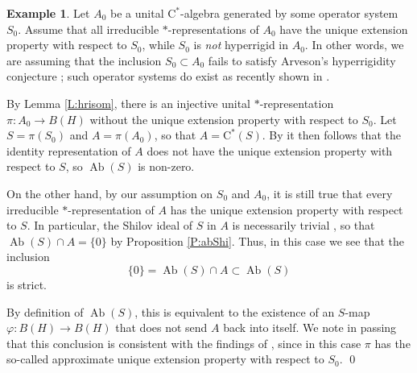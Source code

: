 \documentclass[10pt]{amsart}
\newcommand{\rC}{\mathrm{C}}
\renewcommand{\phi}{\varphi}
\newcommand{\Ab}{\operatorname{Ab}}
\theoremstyle{definition}
\newtheorem{example}{Example}
\begin{document}
\begin{example}\label{E:BDO}
Let $A_0$ be a unital $\rC^*$-algebra generated by some operator system $S_0$. Assume that all irreducible $*$-representations of $A_0$ have the unique extension property with respect to $S_0$, while $S_0$ is \emph{not} hyperrigid in $A_0$.  In other words, we are assuming that the inclusion $S_0\subset A_0$ fails to satisfy Arveson's hyperrigidity conjecture \cite{arveson2011}; such operator systems do exist as recently shown in \cite{BDO2024}. 

By Lemma \ref{L:hrisom}, there is an injective unital $*$-representation $\pi:A_0\to B(H)$ without the unique extension property with respect to $S_0$.  Let $S=\pi(S_0)$ and $A=\pi(A_0)$, so that $A=\rC^*(S)$. By \cite[Theorem 2.1.2]{arveson1969}  it then follows that the identity representation of $A$ does not have the unique extension property with respect to $S$, so $\Ab(S)$ is non-zero. 

On the other hand, by our assumption on $S_0$ and $A_0$, it is still true that every irreducible $*$-representation of $A$ has the unique extension property with respect to $S$. In particular, 
the Shilov ideal of $S$ in $A$ is necessarily trivial \cite[Theorem 2.2.3]{arveson1969}, so that $\Ab(S)\cap A=\{0\}$ by Proposition \ref{P:abShi}.  Thus, in this case we see that the inclusion 
\[
\{0\}=\Ab(S)\cap A\subset \Ab(S)
\]
is strict. 

By definition of $\Ab(S)$, this is equivalent to the existence of an $S$-map $\phi:B(H)\to B(H)$ that does not send $A$ back into itself.  We note in passing that this conclusion is consistent with the findings of \cite[Corollary 4.5]{thompson2024}, since in this case $\pi$ has the so-called approximate unique extension property with respect to $S_0$. \qed
\end{example}




	
\end{document}
